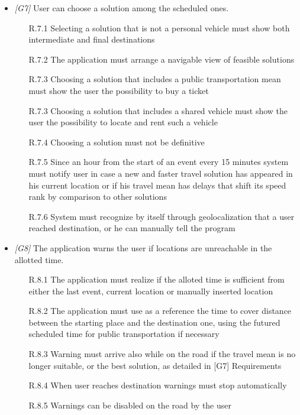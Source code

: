 \begin{itemize}
\begin{itemize}
                        
                  \end{itemize}
                  
\item \textit{[G7]} User can choose a solution among the scheduled ones. 

                   \begin{itemize}
                        \item [R.7.1] Selecting a solution that is not a personal vehicle must show both intermediate and final destinations
                        \item [R.7.2] The application must arrange a navigable view of feasible solutions
                        \item [R.7.3] Choosing a solution that includes a public transportation mean must show the user the possibility to buy a ticket 
                        \item [R.7.3] Choosing a solution that includes a shared vehicle must show the user the possibility to locate and rent such a vehicle
                        \item [R.7.4] Choosing a solution must not be definitive
                        \item [R.7.5] Since an hour from the start of an event every 15 minutes system must notify user in case a new and faster travel solution has appeared in his current location or if his travel mean has delays that shift its speed rank by comparison to other solutions
                        \item [R.7.6] System must recognize by itself through geolocalization that a user reached destination, or he can manually tell the program
                  \end{itemize}
                  
\item \textit{[G8]} The application warns the user if locations are unreachable in the allotted time.

                   \begin{itemize}
                        \item[R.8.1] The application must realize if the alloted time is sufficient from either the last event, current location or manually inserted location
                        \item[R.8.2] The application must use as a reference the time to cover distance between the starting place and the destination one, using the futured scheduled time for public transportation if necessary
                   			\item [R.8.3] Warning must arrive also while on the road if the travel mean is no longer suitable, or the best solution, as detailed in [G7] Requirements
                   			\item [R.8.4] When user reaches destination warnings must stop automatically
                   			\item [R.8.5] Warnings can be disabled on the road by the user
                   \end{itemize}


\end{itemize}
